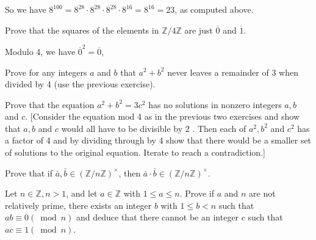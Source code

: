 \begin{questions}
\begin{solution}
So we have \(8^{100}=8^{28} \cdot 8^{28} \cdot 8^{28} \cdot 8^{16}=8^{16}=23\), as computed above.
\end{solution}

\question
    Prove that the squares of the elements in \(\mathbb{Z} / 4 \mathbb{Z}\) are just \(\overline{0}\) and \(\overline{1}\).
\begin{solution}
    Modulo 4, we have \(\overline{0}^2 = \overline{0}\), 
\end{solution}

\question
    Prove for any integers \(a\) and \(b\) that \(a^2+b^2\) never leaves a remainder of 3 when divided by 4 (use the previous exercise).


\begin{solution}
    
\end{solution}


\question
    Prove that the equation \(a^2+b^2=3 c^2\) has no solutions in nonzero integers \(a, b\) and \(c\). [Consider the equation mod 4 as in the previous two exercises and show that \(a, b\) and \(c\) would all have to be divisible by 2 . Then each of \(a^2, b^2\) and \(c^2\) has a factor of 4 and by dividing through by 4 show that there would be a smaller set of solutions to the original equation. Iterate to reach a contradiction.]


\begin{solution}
    
\end{solution}


\question
    Prove that if \(\bar{a}, \bar{b} \in(\mathbb{Z} / n \mathbb{Z})^{\times}\), then \(\bar{a} \cdot \bar{b} \in(\mathbb{Z} / n \mathbb{Z})^{\times}\).


\begin{solution}
    
\end{solution}


\question
    Let \(n \in \mathbb{Z}, n>1\), and let \(a \in \mathbb{Z}\) with \(1 \leq a \leq n\). Prove if \(a\) and \(n\) are not relatively prime, there exists an integer \(b\) with \(1 \leq b<n\) such that \(a b \equiv 0(\bmod n)\) and deduce that there cannot be an integer \(c\) such that \(a c \equiv 1(\bmod n)\).


\begin{solution}
    

\end{solution}
\end{questions}
